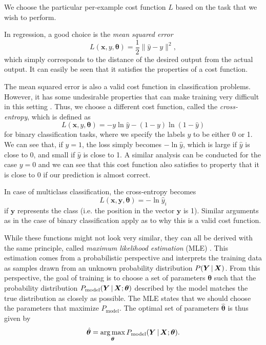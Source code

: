 We choose the particular per-example cost function $L$ based on the task that we wish to perform.

In regression, a good choice is the \emph{mean squared error}
\begin{equation}
L(\bm{x}, y, \bm{\theta}) = \frac1{2}\lVert\hat{y}-y\rVert^2,
\end{equation}
which simply corresponds to the distance of the desired output from the actual output. It can easily be seen that it satisfies the properties of a cost function.

The mean squared error is also a valid cost function in classification problems. However, it has some undesirable properties that can make training very difficult in this setting \cite[Ch.\,6,\,p.\,178]{DBLP:books/daglib/0040158}. Thus, we choose a different cost function, called the \emph{cross-entropy}, which is defined as
\begin{equation}
L(\bm{x}, y, \bm{\theta}) = -y \ln \hat{y} - (1-y)\ln(1-\hat{y})
\end{equation}
for binary classification tasks, where we specify the labels $y$ to be either 0 or 1. We can see that, if $y=1$, the loss simply becomes $-\ln\hat{y}$, which is large if $\hat{y}$ is close to 0, and small if $\hat{y}$ is close to 1. A similar analysis can be conducted for the case $y=0$ and we can see that this cost function also satisfies to property that it is close to 0 if our prediction is almost correct.

In case of multiclass classification, the cross-entropy becomes
\begin{equation}
L(\bm{x}, \bm{y}, \bm{\theta}) = -\ln \hat{y}_i
\end{equation}
if $\bm{y}$ represents the  class (i.e. the  position in the vector $\bm{y}$ is 1). Similar arguments as in the case of binary classification apply as to why this is a valid cost function.

While these functions might not look very similar, they can all be derived with the same principle, called \emph{maximum likelihood estimation} (MLE) \cite[Ch.\,5,\,pp.\,128-131]{DBLP:books/daglib/0040158}. This estimation comes from a probabilistic perspective and interprets the training data as samples drawn from an unknown probability distribution $P(\bm{Y}\,|\,\bm{X})$. From this perspective, the goal of training is to choose a set of parameters $\bm{\theta}$ such that the probability distribution $P_{\text{model}}(\bm{Y}\,|\,\bm{X}; \bm{\theta})$ described by the model matches the true distribution as closely as possible. The MLE states that we should choose the parameters that maximize $P_{\text{model}}$. The optimal set of parameters $\hat{\bm{\theta}}$ is thus given by
\begin{equation}
\hat{\bm{\theta}} = \operatorname*{arg\,max}_{\bm{\theta}} P_{\text{model}}(\bm{Y}\,|\,\bm{X}; \bm{\theta}).
\end{equation}

